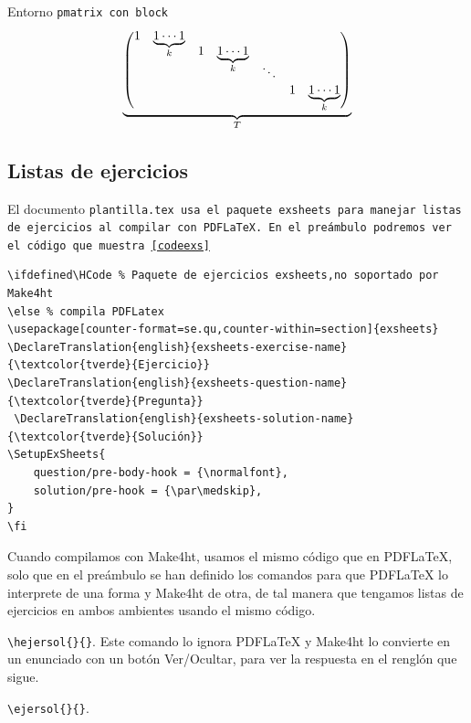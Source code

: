 \documentclass[fleqn,oneside]{article}
\begin{document}
\item[$\bullet$] Entorno \tt{pmatrix} con \tt{block}\\

\[
\underbrace{
	\begin{pmatrix}
		1 & \smash[b]{\underbrace{1 \cdots 1}_{k}} \\
		&& 1 & \smash[b]{\underbrace{1 \cdots 1}_{k}} \\
		&&&& \ddots \\
		&&&&& 1 & \underbrace{1 \cdots 1}_{k}
	\end{pmatrix}
}_{T}
\]

\ee


\subsection{Listas de ejercicios}\label{listaejercicios} El documento \tt{plantilla.tex} usa el paquete \tt{exsheets} para manejar listas de ejercicios al compilar con PDFLaTeX. En el preámbulo podremos ver el código que muestra \ref{codeexs}


\bigskip\begin{lstlisting}[caption={Habilitar \tt{exsheets} para PDFLaTeX},label={codeexs}]
\ifdefined\HCode % Paquete de ejercicios exsheets,no soportado por Make4ht
\else % compila PDFLatex
\usepackage[counter-format=se.qu,counter-within=section]{exsheets}
\DeclareTranslation{english}{exsheets-exercise-name}{\textcolor{tverde}{Ejercicio}}
\DeclareTranslation{english}{exsheets-question-name}{\textcolor{tverde}{Pregunta}}
 \DeclareTranslation{english}{exsheets-solution-name}{\textcolor{tverde}{Solución}}
\SetupExSheets{
	question/pre-body-hook = {\normalfont},
	solution/pre-hook = {\par\medskip},
}
\fi
\end{lstlisting}


Cuando compilamos con Make4ht, usamos el mismo código que en PDFLaTeX, solo que en el preámbulo se han definido los comandos para que PDFLaTeX lo interprete de una forma y Make4ht de otra, de tal manera que tengamos listas de ejercicios en ambos ambientes usando el mismo código.

\be
\item \lstinline+\hejersol{}{}+. Este comando lo ignora PDFLaTeX y Make4ht lo convierte en un enunciado con un botón Ver/Ocultar, para ver la respuesta en el renglón que sigue.

\item \lstinline+\ejersol{}{}+.
\end{document}
